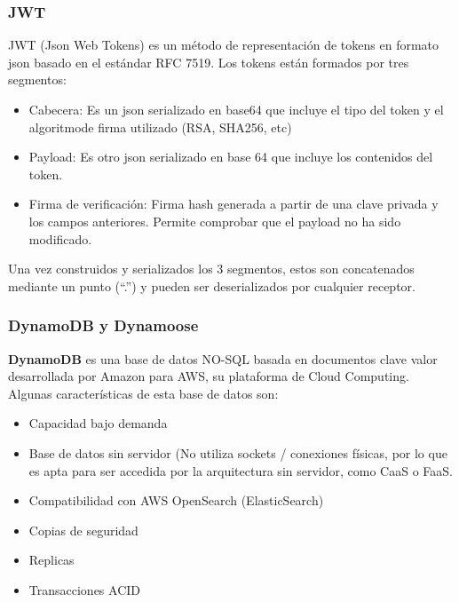 \hypertarget{jwt}{%
\subsubsection{JWT}\label{jwt}}

JWT (Json Web Tokens) es un método de representación de tokens en
formato json basado en el estándar RFC 7519. Los tokens están formados
por tres segmentos:

\begin{itemize}
\item
  Cabecera: Es un json serializado en base64 que incluye el tipo del
  token y el algoritmode firma utilizado (RSA, SHA256, etc)
\item
  Payload: Es otro json serializado en base 64 que incluye los
  contenidos del token.
\item
  Firma de verificación: Firma hash generada a partir de una clave
  privada y los campos anteriores. Permite comprobar que el payload no
  ha sido modificado.
\end{itemize}

Una vez construidos y serializados los 3 segmentos, estos son
concatenados mediante un punto (``.'') y pueden ser deserializados por
cualquier receptor.

\hypertarget{dynamodb-y-dynamoose}{%
\subsubsection{DynamoDB y Dynamoose}\label{dynamodb-y-dynamoose}}

\textbf{DynamoDB} es una base de datos NO-SQL basada en documentos clave
valor desarrollada por Amazon para AWS, su plataforma de Cloud
Computing.\\
Algunas características de esta base de datos son:

\begin{itemize}
\item
  Capacidad bajo demanda
\item
  Base de datos sin servidor (No utiliza sockets / conexiones físicas,
  por lo que es apta para ser accedida por la arquitectura sin servidor,
  como CaaS o FaaS.
\item
  Compatibilidad con AWS OpenSearch (ElasticSearch)
\item
  Copias de seguridad
\item
  Replicas
\item
  Transacciones ACID
\end{itemize}

